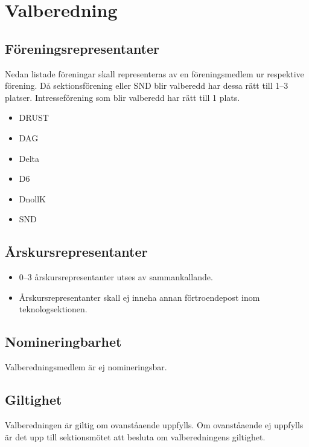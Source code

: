 \section{Valberedning}
\subsection{Föreningsrepresentanter}
Nedan listade föreningar skall representeras av en föreningsmedlem ur respektive förening. Då sektionsförening eller SND blir valberedd har dessa rätt till 1--3 platser. Intresseförening som blir valberedd har rätt till 1 plats. 
\begin{itemize}
  \item DRUST 
  \item DAG 
  \item Delta 
  \item D6 
  \item DnollK 
  \item SND 
\end{itemize}
\subsection{Årskursrepresentanter}
\begin{itemize}
  \item 0--3 årskursrepresentanter utses av sammankallande. 
  \item Årskursrepresentanter skall ej inneha annan förtroendepost inom teknologsektionen. 
\end{itemize}
\subsection{Nomineringbarhet}
Valberedningsmedlem är ej nomineringsbar.
\subsection{Giltighet}
Valberedningen är giltig om ovanståaende uppfylls. Om ovanståaende ej uppfylls är det upp till sektionsmötet att besluta om valberedningens giltighet.
